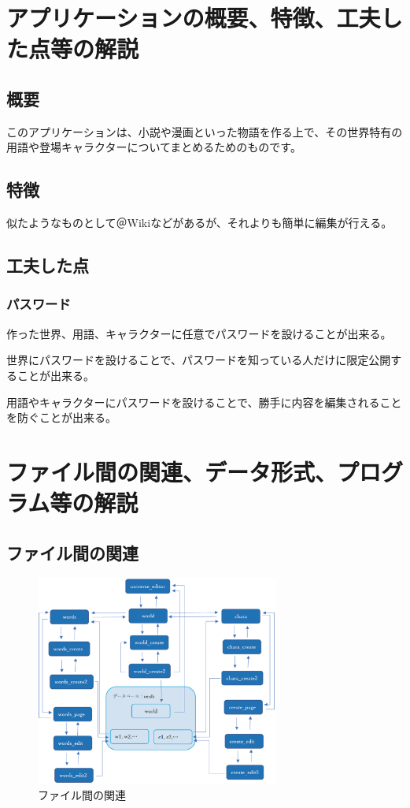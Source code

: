 \documentclass[12pt,a4paper]{jarticle}
\begin{document}
\begin{ttfamily}

\section{アプリケーションの概要、特徴、工夫した点等の解説}
\subsection{概要}
このアプリケーションは、小説や漫画といった物語を作る上で、その世界特有の用語や登場キャラクターについてまとめるためのものです。
\subsection{特徴}
似たようなものとして＠Wikiなどがあるが、それよりも簡単に編集が行える。
\subsection{工夫した点}
\subsubsection{パスワード}
作った世界、用語、キャラクターに任意でパスワードを設けることが出来る。
\par 世界にパスワードを設けることで、パスワードを知っている人だけに限定公開することが出来る。
\par 用語やキャラクターにパスワードを設けることで、勝手に内容を編集されることを防ぐことが出来る。


\section{ファイル間の関連、データ形式、プログラム等の解説}
\subsection{ファイル間の関連}
\begin{figure}[h]
  \includegraphics[width = 80mm]{10-2.eps}
  \centering
  \caption{ファイル間の関連}
\end{figure}

\end{ttfamily}
\end{document}
